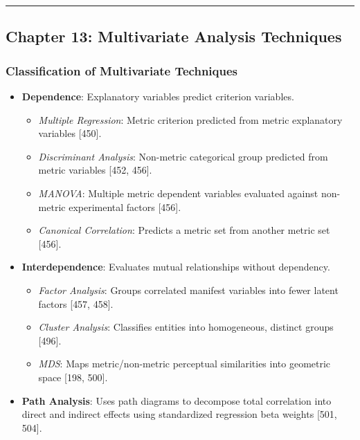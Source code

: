 \documentclass[
]{article}
\providecommand{\tightlist}{%
  \setlength{\itemsep}{0pt}\setlength{\parskip}{0pt}}
\begin{document}
\begin{center}\rule{0.5\linewidth}{0.5pt}\end{center}

\subsection{Chapter 13: Multivariate Analysis
Techniques}\label{chapter-13-multivariate-analysis-techniques}

\subsubsection{Classification of Multivariate
Techniques}\label{classification-of-multivariate-techniques}

\begin{itemize}
\tightlist
\item
  \textbf{Dependence}: Explanatory variables predict criterion
  variables.

  \begin{itemize}
  \tightlist
  \item
    \emph{Multiple Regression}: Metric criterion predicted from metric
    explanatory variables {[}450{]}.
  \item
    \emph{Discriminant Analysis}: Non-metric categorical group predicted
    from metric variables {[}452, 456{]}.
  \item
    \emph{MANOVA}: Multiple metric dependent variables evaluated against
    non-metric experimental factors {[}456{]}.
  \item
    \emph{Canonical Correlation}: Predicts a metric set from another
    metric set {[}456{]}.
  \end{itemize}
\item
  \textbf{Interdependence}: Evaluates mutual relationships without
  dependency.

  \begin{itemize}
  \tightlist
  \item
    \emph{Factor Analysis}: Groups correlated manifest variables into
    fewer latent factors {[}457, 458{]}.
  \item
    \emph{Cluster Analysis}: Classifies entities into homogeneous,
    distinct groups {[}496{]}.
  \item
    \emph{MDS}: Maps metric/non-metric perceptual similarities into
    geometric space {[}198, 500{]}.
  \end{itemize}
\item
  \textbf{Path Analysis}: Uses path diagrams to decompose total
  correlation into direct and indirect effects using standardized
  regression beta weights {[}501, 504{]}.
\end{itemize}
\end{document}
